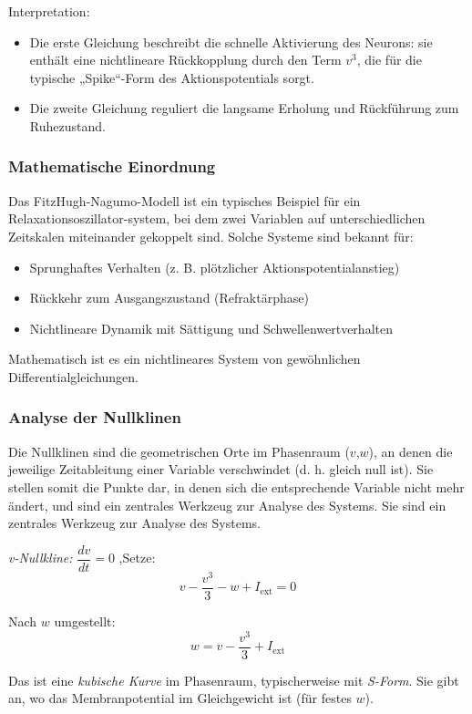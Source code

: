 \begin{refsection}
Interpretation:
\begin{itemize}
    \item Die erste Gleichung beschreibt die schnelle Aktivierung des Neurons: sie enthält eine nichtlineare Rückkopplung durch den Term $v^3$, die für die typische „Spike“-Form des Aktionspotentials sorgt.
    \item Die zweite Gleichung reguliert die langsame Erholung und Rückführung zum Ruhezustand.
\end{itemize}
\subsubsection{Mathematische Einordnung}
Das FitzHugh-Nagumo-Modell ist ein typisches Beispiel für ein Relaxationsoszillator-system, bei dem zwei Variablen auf unterschiedlichen Zeitskalen miteinander gekoppelt sind. Solche Systeme sind bekannt für:
\begin{itemize}
	\item Sprunghaftes Verhalten (z. B. plötzlicher Aktionspotentialanstieg)
	\item Rückkehr zum Ausgangszustand (Refraktärphase)
	\item Nichtlineare Dynamik mit Sättigung und Schwellenwertverhalten
\end{itemize}
Mathematisch ist es ein nichtlineares System von gewöhnlichen Differentialgleichungen.
\subsubsection{Analyse der Nullklinen}
Die Nullklinen sind die geometrischen Orte im Phasenraum ($v$,$w$), an denen die jeweilige Zeitableitung einer Variable verschwindet (d. h. gleich null ist). Sie stellen somit die Punkte dar, in denen sich die entsprechende Variable nicht mehr ändert, und sind ein zentrales Werkzeug zur Analyse des Systems. Sie sind ein zentrales Werkzeug zur Analyse des Systems.

\emph{v-Nullkline:} $\dfrac{dv}{dt} = 0$
\noindent
 ,Setze:
\[
v - \frac{v^3}{3} - w + I_{\text{ext}} = 0
\]

\noindent
Nach $w$ umgestellt:
\[
w = v - \frac{v^3}{3} + I_{\text{ext}}
\]

Das ist eine \emph{kubische Kurve} im Phasenraum, typischerweise mit \emph{S-Form}.  
Sie gibt an, wo das Membranpotential im Gleichgewicht ist (für festes $w$).

\vspace{1em}


\end{refsection}

